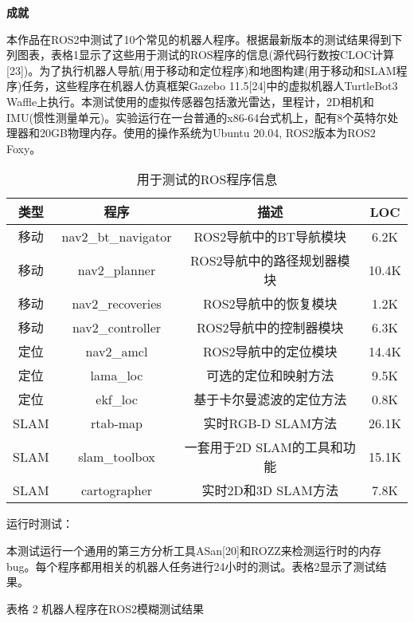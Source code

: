 \textbf{成就}

本作品在ROS2中测试了10个常见的机器人程序。根据最新版本的测试结果得到下列图表，表格1显示了这些用于测试的ROS程序的信息(源代码行数按CLOC计算{[}23{]})。为了执行机器人导航(用于移动和定位程序)和地图构建(用于移动和SLAM程序)任务，这些程序在机器人仿真框架Gazebo
11.5{[}24{]}中的虚拟机器人TurtleBot3
Waffle上执行。本测试使用的虚拟传感器包括激光雷达，里程计，2D相机和IMU(惯性测量单元)。实验运行在一台普通的x86-64台式机上，配有8个英特尔处理器和20GB物理内存。使用的操作系统为Ubuntu
20.04, ROS2版本为ROS2 Foxy。


\begin{table}[H]
\small
\caption{用于测试的ROS程序信息}
\label{tb:ros_test}
\centering
\begin{tabular}{cccc}
\hline  
\textbf{类型} & \textbf{程序} & \textbf{描述} & \textbf{LOC} \\ 
\hline  
移动 & nav2\_bt\_navigator & ROS2导航中的BT导航模块 & 6.2K \\
移动 & nav2\_planner & ROS2导航中的路径规划器模块 & 10.4K \\
移动 & nav2\_recoveries & ROS2导航中的恢复模块 & 1.2K \\
移动 & nav2\_controller & ROS2导航中的控制器模块 & 6.3K \\
定位 & nav2\_amcl & ROS2导航中的定位模块 & 14.4K \\
定位 & lama\_loc & 可选的定位和映射方法 & 9.5K \\
定位 & ekf\_loc & 基于卡尔曼滤波的定位方法 & 0.8K \\
SLAM & rtab-map & 实时RGB-D SLAM方法 & 26.1K \\
SLAM & slam\_toolbox & 一套用于2D SLAM的工具和功能 & 15.1K \\
SLAM & cartographer & 实时2D和3D SLAM方法 & 7.8K \\
\hline
\end{tabular} 
\end{table}


运行时测试：

本测试运行一个通用的第三方分析工具ASan{[}20{]}和ROZZ来检测运行时的内存bug。每个程序都用相关的机器人任务进行24小时的测试。表格2显示了测试结果。

表格 2 机器人程序在ROS2模糊测试结果

